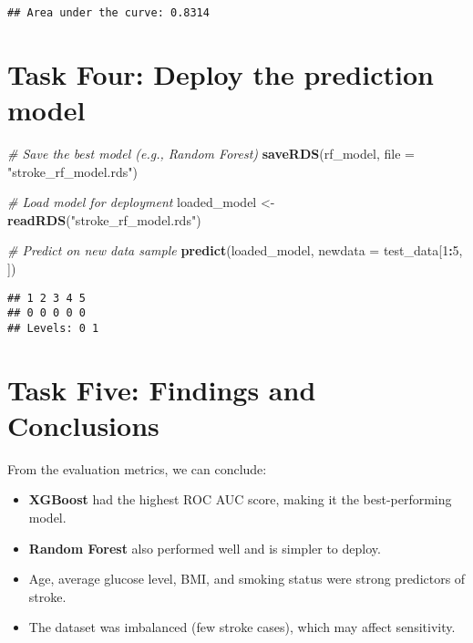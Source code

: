 \documentclass[
]{article}
\newenvironment{Shaded}{\begin{snugshade}}{\end{snugshade}}
\newcommand{\AttributeTok}[1]{\textcolor[rgb]{0.13,0.29,0.53}{#1}}
\newcommand{\CommentTok}[1]{\textcolor[rgb]{0.56,0.35,0.01}{\textit{#1}}}
\newcommand{\DecValTok}[1]{\textcolor[rgb]{0.00,0.00,0.81}{#1}}
\newcommand{\FunctionTok}[1]{\textcolor[rgb]{0.13,0.29,0.53}{\textbf{#1}}}
\newcommand{\NormalTok}[1]{#1}
\newcommand{\OtherTok}[1]{\textcolor[rgb]{0.56,0.35,0.01}{#1}}
\newcommand{\SpecialCharTok}[1]{\textcolor[rgb]{0.81,0.36,0.00}{\textbf{#1}}}
\newcommand{\StringTok}[1]{\textcolor[rgb]{0.31,0.60,0.02}{#1}}
\providecommand{\tightlist}{%
  \setlength{\itemsep}{0pt}\setlength{\parskip}{0pt}}
\begin{document}
\begin{verbatim}
## Area under the curve: 0.8314
\end{verbatim}

\section{Task Four: Deploy the prediction
model}\label{task-four-deploy-the-prediction-model}

\begin{Shaded}
\begin{Highlighting}[]
\CommentTok{\# Save the best model (e.g., Random Forest)}
\FunctionTok{saveRDS}\NormalTok{(rf\_model, }\AttributeTok{file =} \StringTok{"stroke\_rf\_model.rds"}\NormalTok{)}

\CommentTok{\# Load model for deployment}
\NormalTok{loaded\_model }\OtherTok{\textless{}{-}} \FunctionTok{readRDS}\NormalTok{(}\StringTok{"stroke\_rf\_model.rds"}\NormalTok{)}

\CommentTok{\# Predict on new data sample}
\FunctionTok{predict}\NormalTok{(loaded\_model, }\AttributeTok{newdata =}\NormalTok{ test\_data[}\DecValTok{1}\SpecialCharTok{:}\DecValTok{5}\NormalTok{, ])}
\end{Highlighting}
\end{Shaded}

\begin{verbatim}
## 1 2 3 4 5 
## 0 0 0 0 0 
## Levels: 0 1
\end{verbatim}

\section{Task Five: Findings and
Conclusions}\label{task-five-findings-and-conclusions}

From the evaluation metrics, we can conclude:

\begin{itemize}
\tightlist
\item
  \textbf{XGBoost} had the highest ROC AUC score, making it the
  best-performing model.
\item
  \textbf{Random Forest} also performed well and is simpler to deploy.
\item
  Age, average glucose level, BMI, and smoking status were strong
  predictors of stroke.
\item
  The dataset was imbalanced (few stroke cases), which may affect
  sensitivity.
\end{itemize}
\end{document}
